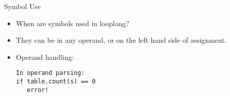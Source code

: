 \documentclass[]{beamer}
\begin{document}
\begin{frame}[fragile]{Symbol Use}
    \begin{itemize}[<+->]
        \item When are symbols used in looplang?
        \item They can be in any operand, or on the left hand side of
            assignment.
        \item Operand handling:
        \begin{verbatim}
In operand parsing:
if table.count(s) == 0
   error! 
        \end{verbatim}
    \end{itemize}
\end{frame}
\end{document}
